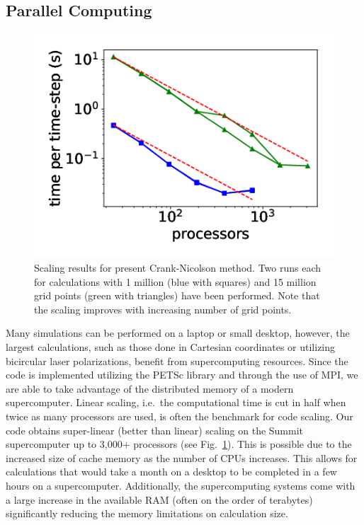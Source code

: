\subsection{Parallel Computing} %
\label{sub:parallel_computing}
\begin{figure}[!ht]
\centering
\includegraphics[width=0.5\columnwidth]{figs/Rydberg/multi_node.png}
\caption{\label{fig:scaling} Scaling results for present Crank-Nicolson method. Two runs each for calculations with 1 million (blue with squares) and 15 million grid points (green with triangles) have been performed. Note that the scaling improves with increasing number of grid points.
}
\end{figure}
Many simulations can be performed on a laptop or small desktop, however, the largest calculations, such as those done in Cartesian coordinates or utilizing bicircular laser polarizations, benefit from supercomputing resources. Since the code is implemented utilizing the PETSc library and through the use of MPI, we are able to take advantage of the distributed memory of a modern supercomputer. Linear scaling, i.e.\ the computational time is cut in half when twice as many processors are used, is often the benchmark for code scaling. Our code obtains super-linear (better than linear) scaling on the Summit supercomputer up to 3,000+ processors (see Fig.~\ref{fig:scaling}). This is possible due to the increased size of cache memory as the number of CPUs increases. This allows for calculations that would take a month on a desktop to be completed in a few hours on a supercomputer. Additionally, the supercomputing systems come with a large increase in the available RAM (often on the order of terabytes) significantly reducing the memory limitations on calculation size.




